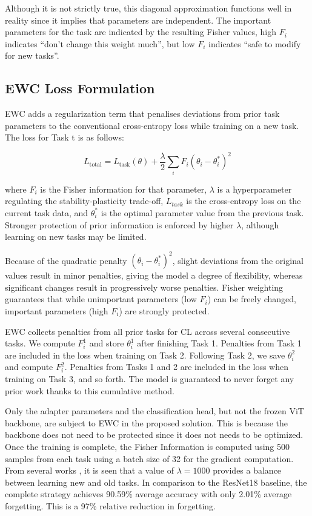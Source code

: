 \documentclass[english, LaM, oneside]{sapthesis}%
\numberwithin{equation}{chapter}
\begin{document}
Although it is not strictly true, this diagonal approximation functions well in reality since it implies that parameters are independent\cite{35}. The important parameters for the task are indicated by the resulting Fisher values, high $F_i$ indicates \enquote{don't change this weight much}, but low $F_i$ indicates \enquote{safe to modify for new tasks}.

\subsection{EWC Loss Formulation}
EWC adds a regularization term that penalises deviations from prior task parameters to the conventional cross-entropy loss while training on a new task\cite{2}. The loss for Task t is as follows:

\begin{equation}
    L_{\text{total}} = L_{\text{task}}(\theta) + \frac{\lambda}{2} \sum_{i} F_i \left( \theta_i - \theta_i^* \right)^2
\end{equation}

where $F_i$ is the Fisher information for that parameter, $\lambda$ is a hyperparameter regulating the stability-plasticity trade-off, $L_{task}$ is the cross-entropy loss on the current task data, and $\theta^*_i$ is the optimal parameter value from the previous task. Stronger protection of prior information is enforced by higher $\lambda$, although learning on new tasks may be limited.

Because of the quadratic penalty $(\theta_i - \theta^*_i)^2$, slight deviations from the original values result in minor penalties, giving the model a degree of flexibility, whereas significant changes result in progressively worse penalties. Fisher weighting guarantees that while unimportant parameters (low $F_i$) can be freely changed, important parameters (high $F_i$) are strongly protected.

EWC collects penalties from all prior tasks for CL across several consecutive tasks. We compute $F^1_i$ and store $\theta^1_i$ after finishing Task 1. Penalties from Task 1 are included in the loss when training on Task 2. Following Task 2, we save $\theta^2_i$ and compute $F^2_i$. Penalties from Tasks 1 and 2 are included in the loss when training on Task 3, and so forth. The model is guaranteed to never forget any prior work thanks to this cumulative method.

Only the adapter parameters and the classification head, but not the frozen ViT backbone, are subject to EWC in the proposed solution. This is because the backbone does not need to be protected since it does not needs to be optimized. Once the training is complete, the Fisher Information is computed using 500 samples from each task using a batch size of 32 for the gradient computation. From several works \cite{2}\cite{18}\cite{36}\cite{mirzadeh}, it is seen that a value of $ \lambda = 1000$ provides a balance between learning new and old tasks. In comparison to the ResNet18 baseline, the complete strategy achieves 90.59\% average accuracy with only 2.01\% average forgetting. This is a 97\% relative reduction in forgetting.
\end{document}
